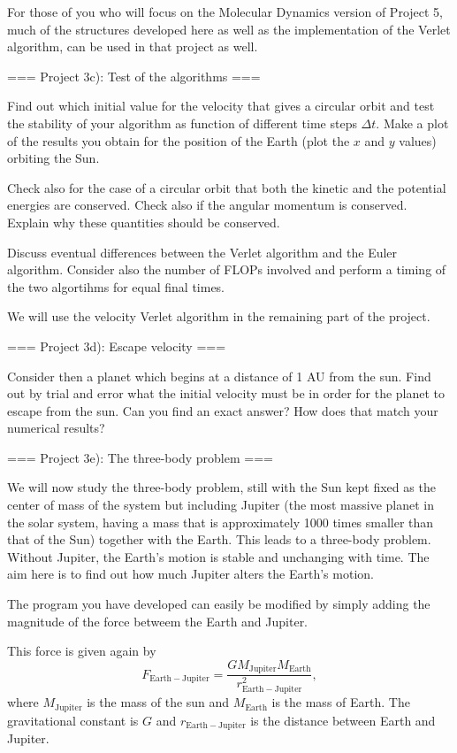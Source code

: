 \documentclass[11pt,a4paper]{article}
\begin{document}
For those of you who will focus on the Molecular Dynamics version of Project 5, much of the structures developed here as well as the implementation of the Verlet algorithm, can be used in that project as well.

=== Project 3c): Test of the algorithms ===

Find out which initial value for the velocity that gives a circular orbit
and test the stability of your algorithm as function of different time steps $\Delta t$. 
Make a plot of the results you obtain for the position of the Earth (plot the $x$ and $y$ values) orbiting  the Sun.

Check also for the case of a circular orbit that both the kinetic and the potential energies are conserved.
Check also if the  angular momentum is conserved. Explain why these quantities
should be conserved.

Discuss eventual differences between the Verlet algorithm and the Euler algorithm. Consider also the number of FLOPs involved and perform a timing of the
two algortihms for equal final times.

We will use the velocity Verlet algorithm in the remaining part of the project. 


=== Project 3d): Escape velocity ===

Consider then a planet which begins at a distance of 1 AU from the sun. Find out by trial and error
what the initial velocity must be in order for the planet to escape from the sun.  Can you find an exact answer?  How does that match your numerical results?

=== Project 3e): The three-body problem ===

We will now study the three-body problem, still with the Sun kept fixed as the center of mass of the system  but 
including Jupiter (the most massive planet in the solar system, having a mass that is approximately 1000 times
smaller than that of the Sun) together with the Earth. This leads to a three-body problem. Without Jupiter, the Earth's motion is stable and unchanging with time. The aim here is to find out how much Jupiter alters the Earth's motion.

The program you have developed can easily be modified by simply adding the magnitude of the force betweem the Earth and Jupiter.

This force is given again by 
\[
F_{\mathrm{Earth-Jupiter}}=\frac{GM_{\mathrm{Jupiter}}M_{\mathrm{Earth}}}{r_{\mathrm{Earth-Jupiter}}^2},
\]
where $M_{\mathrm{Jupiter}}$ is the mass of the sun and $M_{\mathrm{Earth}}$ is the mass of Earth. 
The gravitational constant is $G$ and $r_{\mathrm{Earth-Jupiter}}$ is the distance between Earth and Jupiter.
\end{document}
